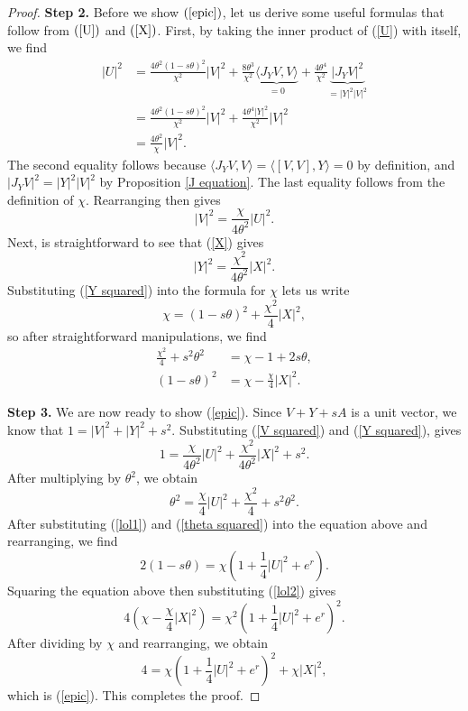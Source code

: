 \documentclass{amsart}
\theoremstyle{plain}
\theoremstyle{definition}
\theoremstyle{remark}
\begin{document}
\begin{proof}
	
		\textbf{Step 2.} Before we show $(\ref{epic})$, let us derive some useful formulas that follow from $(\ref{U})$ and $(\ref{X})$. First, by taking the inner product of (\ref{U}) with itself, we find 
		\begin{align}
			|U|^2 &= \frac{4\theta^2(1-s\theta)^2}{\chi^2}|V|^2 + \frac{8 \theta^3}{\chi^2}\underbrace{\langle J_Y V,V \rangle}_{=0} + \frac{4 \theta^4}{\chi^2} \underbrace{|J_Y V|^2}_{=|Y|^2 |V|^2}\nonumber \\
			&= \frac{4\theta^2(1-s\theta)^2}{\chi^2}|V|^2 + \frac{4 \theta^4 |Y|^2}{\chi^2}|V|^2 \nonumber\\
			&= \frac{4 \theta^2}{\chi} |V|^2. \nonumber
		\end{align}
		The second equality follows because $\langle J_Y V,V \rangle = \langle [V,V],Y \rangle = 0$ by definition, and $|J_Y V|^2 = |Y|^2 |V|^2$ by Proposition \ref{J equation}. The last equality follows from the definition of $\chi$. Rearranging then gives 
		\begin{equation}
			|V|^2 = \frac{\chi}{4 \theta^2} |U|^2. \label{V squared}
		\end{equation}
		Next, is straightforward to see that (\ref{X}) gives
		\begin{equation}
			|Y|^2 = \frac{\chi^2}{4 \theta^2}|X|^2. \label{Y squared}
		\end{equation}
		Substituting (\ref{Y squared}) into the formula for $\chi$ lets us write 
		$$\chi =(1-s\theta)^2 + \frac{\chi^2}{4}|X|^2,$$
		so after straightforward manipulations, we find
		\begin{align}
			\frac{\chi^2}{4} + s^2 \theta^2 &= \chi - 1 + 2 s \theta,\label{lol1} \\
			(1-s\theta)^2 &= \chi - \frac{\chi}{4}|X|^2. \label{lol2}
		\end{align}
	
		\textbf{Step 3.} We are now ready to show (\ref{epic}). Since $V + Y + sA$ is a unit vector, we know that $1 = |V|^2 + |Y|^2 + s^2$. Substituting (\ref{V squared}) and (\ref{Y squared}), gives 
		$$
			1 = \frac{\chi}{4 \theta^2} |U|^2 + \frac{\chi^2}{4 \theta^2}|X|^2 + s^2.
		$$
		After multiplying by $\theta^2$, we obtain 
		\begin{equation}
			\theta^2 = \frac{\chi}{4} |U|^2 + \frac{\chi^2}{4} + s^2 \theta^2.
		\end{equation}
		After substituting  (\ref{lol1}) and (\ref{theta squared}) into the equation above and rearranging, we find
		$$2(1-s\theta) = \chi\left(1 + \frac14 |U|^2 + e^r\right).$$
		Squaring the equation above then substituting (\ref{lol2}) gives 
		$$4\left( \chi - \frac{\chi}{4}|X|^2\right) = \chi^2\left(1 + \frac14 |U|^2 + e^r\right)^2.$$
		After dividing by $\chi$ and rearranging, we obtain 
		$$4 = \chi\left(1 + \frac14 |U|^2 + e^r\right)^2 + \chi |X|^2,$$
		which is (\ref{epic}). This completes the proof.
	\end{proof}
	
\end{document}
